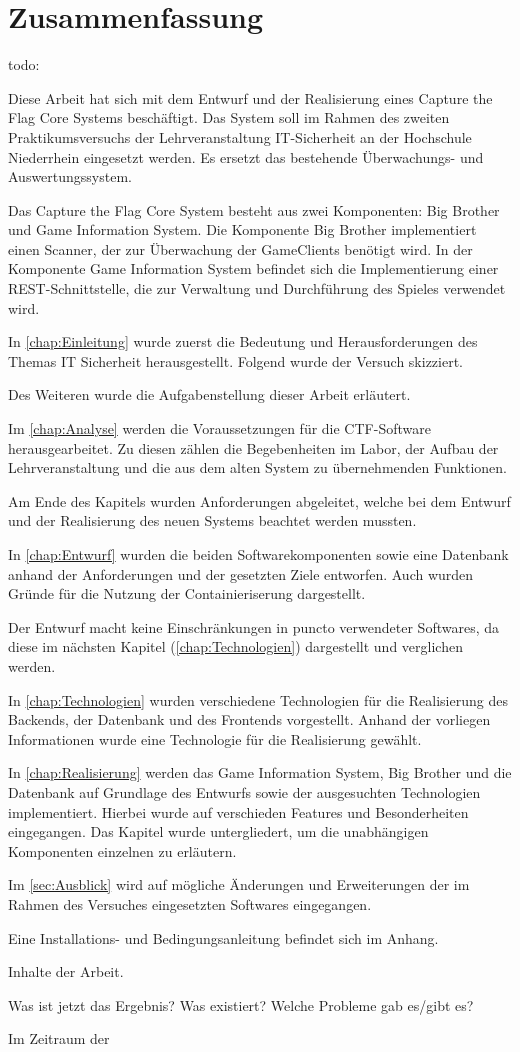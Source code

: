 \section{Zusammenfassung}
todo:

Diese Arbeit hat sich mit dem Entwurf und der Realisierung eines Capture the Flag Core Systems beschäftigt. Das System soll im Rahmen des zweiten Praktikumsversuchs der Lehrveranstaltung IT-Sicherheit an der Hochschule Niederrhein eingesetzt werden. Es ersetzt das bestehende Überwachungs- und Auswertungssystem.

Das Capture the Flag Core System besteht aus zwei Komponenten: Big Brother und Game Information System. Die Komponente Big Brother implementiert einen Scanner, der zur Überwachung der GameClients benötigt wird. In der Komponente Game Information System befindet sich die Implementierung einer REST-Schnittstelle, die zur Verwaltung und Durchführung des Spieles verwendet wird.

In \autoref{chap:Einleitung} wurde zuerst die Bedeutung und Herausforderungen des Themas IT Sicherheit herausgestellt. Folgend wurde der Versuch  skizziert.

Des Weiteren wurde die Aufgabenstellung dieser Arbeit erläutert.

Im \autoref{chap:Analyse} werden die Voraussetzungen für die CTF-Software herausgearbeitet. Zu diesen zählen die Begebenheiten im Labor, der Aufbau der Lehrveranstaltung und die aus dem alten System zu übernehmenden Funktionen.

Am Ende des Kapitels wurden Anforderungen abgeleitet, welche bei dem Entwurf und der Realisierung des neuen Systems beachtet werden mussten.

In \autoref{chap:Entwurf} wurden die beiden Softwarekomponenten sowie eine Datenbank anhand der Anforderungen und der gesetzten Ziele entworfen. Auch wurden Gründe für die Nutzung der Containieriserung dargestellt. 

Der Entwurf macht keine Einschränkungen in puncto verwendeter Softwares, da diese im nächsten Kapitel (\ref{chap:Technologien}) dargestellt und verglichen werden.

In \autoref{chap:Technologien} wurden verschiedene Technologien für die Realisierung des Backends, der Datenbank und des Frontends vorgestellt. Anhand der vorliegen Informationen wurde eine Technologie für die Realisierung gewählt.

In \autoref{chap:Realisierung} werden das Game Information System, Big Brother und die Datenbank auf Grundlage des Entwurfs sowie der ausgesuchten Technologien implementiert. Hierbei wurde auf verschieden Features und Besonderheiten eingegangen. Das Kapitel wurde untergliedert, um die unabhängigen Komponenten einzelnen zu erläutern.

Im \autoref{sec:Ausblick} wird auf mögliche Änderungen und Erweiterungen der im Rahmen des Versuches eingesetzten Softwares eingegangen.

Eine Installations- und Bedingungsanleitung befindet sich im Anhang.

Inhalte der Arbeit.

Was ist jetzt das Ergebnis? Was existiert? Welche Probleme gab es/gibt es?
 
Im Zeitraum der 